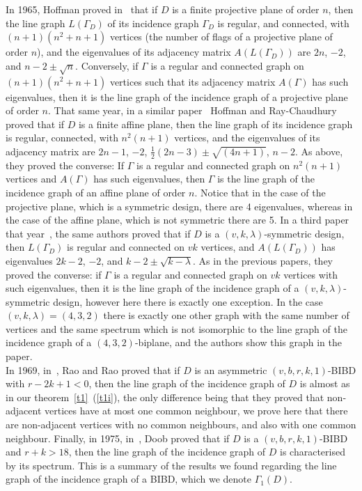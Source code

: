 \documentclass[letterpaper,10pt]{article}
\theoremstyle{plain}
\theoremstyle{definition}
\begin{document}
In 1965, Hoffman proved in~\cite{Hf} that if $D$ is a finite projective plane of order $n$, then the line graph $L(\Gamma_D)$ of its incidence graph $\Gamma_D$ is regular, and connected, with $(n+1)(n^2+n+1)$ vertices (the number of flags of a projective plane of order $n$), and the eigenvalues of its adjacency matrix $A(L(\Gamma_D))$ are $2n$, $-2$, and $n-2\pm\sqrt{n}$. Conversely, if $\Gamma$ is a regular and connected graph on $(n+1)(n^2+n+1)$ vertices such that its adjacency matrix $A(\Gamma)$ has such eigenvalues, then it is the line graph of the incidence graph of a projective plane of order $n$. That same year, in a similar paper~\cite{HR1} Hoffman and Ray-Chaudhury proved that if $D$ is a finite affine plane, then the line graph of its incidence graph is regular, connected, with $n^2(n+1)$ vertices, and the eigenvalues of its adjacency matrix are $2n-1$, $-2$, $\frac{1}{2}(2n-3)\pm\sqrt{(4n+1)}$, $n-2$. As above, they proved the converse: If $\Gamma$ is a regular and connected graph on $n^2(n+1)$ vertices and $A(\Gamma)$ has such eigenvalues, then $\Gamma$ is the line graph of the incidence graph of an affine plane of order $n$. Notice that in the case of the projective plane, which is a symmetric design, there are 4 eigenvalues, whereas in the case of the affine plane, which is not symmetric there are 5. In a third paper that year~\cite{HR2}, the same authors proved that if $D$ is a $(v,k,\lambda)$-symmetric design, then $L(\Gamma_D)$ is regular and connected on $vk$ vertices, and $A(L(\Gamma_D))$ has eigenvalues $2k-2$, $-2$, and $k-2\pm\sqrt{k-\lambda}$. As in the previous papers, they proved the converse: if $\Gamma$ is a regular and connected graph on $vk$ vertices with such eigenvalues, then it is the line graph of the incidence graph of a $(v,k,\lambda)$-symmetric design, however here there is exactly one exception. In the case $(v,k,\lambda)=(4,3,2)$ there is exactly one other graph with the same number of vertices and the same spectrum which is not isomorphic to the line graph of the incidence graph of a $(4,3,2)$-biplane, and the authors show this graph in the paper.\\

In 1969, in~\cite{RR}, Rao and Rao proved that if $D$ is an asymmetric $(v,b,r,k,1)$-BIBD with $r-2k+1<0$, then the line graph of the incidence graph of $D$ is almost as in our theorem~\ref{t1}~(\ref{t1i}), the only difference being that they proved that non-adjacent vertices have at most one common neighbour, we prove here that there are non-adjacent vertices with no common neighbours, and also with one common neighbour. Finally, in 1975, in~\cite{Db}, Doob proved that if $D$ is a $(v,b,r,k,1)$-BIBD and $r+k>18$, then the line graph of the incidence graph of $D$ is characterised by its spectrum. This is a summary of the results we found regarding the line graph of the incidence graph of a BIBD, which we denote $\Gamma_1(D)$.\\
\end{document}
